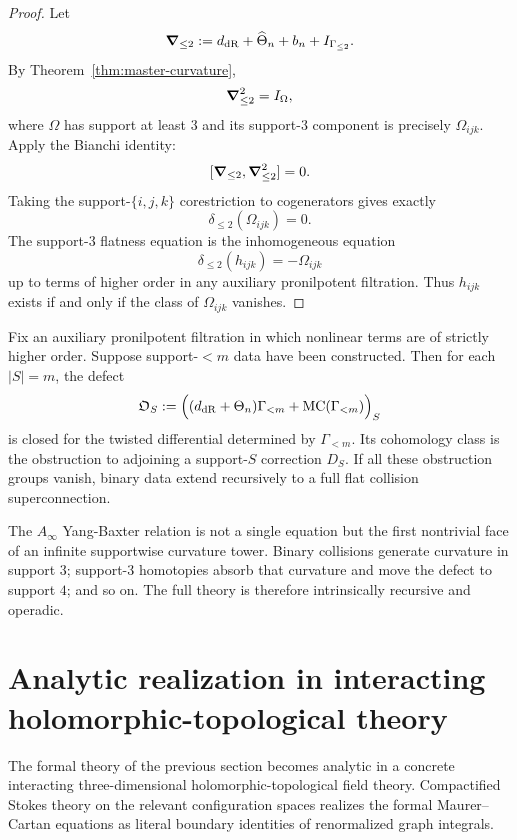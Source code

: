 \begin{proof}
Let
\[
 \boldsymbol{\nabla}_{\le 2}:=d_{\mathrm{dR}}+\widehat\Theta_n+b_n+I_{\Gamma_{\le 2}}.
\]
By Theorem~\ref{thm:master-curvature},
\[
 \boldsymbol{\nabla}_{\le 2}^2 = I_{\Omega},
\]
where $\Omega$ has support at least $3$ and its support-$3$ component is precisely $\Omega_{ijk}$. Apply the Bianchi identity:
\[
 [\boldsymbol{\nabla}_{\le 2},\boldsymbol{\nabla}_{\le 2}^2]=0.
\]
Taking the support-$\{i,j,k\}$ corestriction to cogenerators gives exactly
\[
 \delta_{\le 2}(\Omega_{ijk})=0.
\]
The support-$3$ flatness equation is the inhomogeneous equation
\[
 \delta_{\le 2}(h_{ijk})=-\Omega_{ijk}
\]
up to terms of higher order in any auxiliary pronilpotent filtration. Thus $h_{ijk}$ exists if and only if the class of $\Omega_{ijk}$ vanishes.
\end{proof}

\begin{corollary}%
Fix an auxiliary pronilpotent filtration in which nonlinear terms are of strictly higher order. Suppose support-$<m$ data have been constructed. Then for each $|S|=m$, the defect
\[
 \mathfrak O_S:=\Big((d_{\mathrm{dR}}+\Theta_n)\Gamma_{<m}+\mathrm{MC}(\Gamma_{<m})\Big)_S
\]
is closed for the twisted differential determined by $\Gamma_{<m}$. Its cohomology class is the obstruction to adjoining a support-$S$ correction $D_S$. If all these obstruction groups vanish, binary data extend recursively to a full flat collision superconnection.
\end{corollary}

\begin{remark}
The $A_\infty$ Yang-Baxter relation is not a single equation but the first nontrivial face of an infinite supportwise curvature tower. Binary collisions generate curvature in support $3$; support-$3$ homotopies absorb that curvature and move the defect to support $4$; and so on. The full theory is therefore intrinsically recursive and operadic.
\end{remark}

\section{Analytic realization in interacting holomorphic-topological theory}%

The formal theory of the previous section becomes analytic in a concrete interacting three-dimensional holomorphic-topological field theory. Compactified Stokes theory on the relevant configuration spaces realizes the formal Maurer--Cartan equations as literal boundary identities of renormalized graph integrals.

